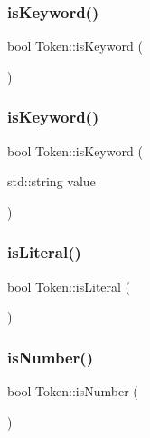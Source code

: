 \mbox{\label{classToken_a5ce5cda79ee936e3c9ff0fb3969420f8}} 
\subsubsection{\texorpdfstring{is\+Keyword()}{isKeyword()}\hspace{0.1cm}{\footnotesize\ttfamily [1/2]}}
{\footnotesize\ttfamily bool Token\+::is\+Keyword (\begin{DoxyParamCaption}{ }\end{DoxyParamCaption})}

\mbox{\label{classToken_a86d5ce12cf462b6621ccc2a8465b5bc0}} 
\subsubsection{\texorpdfstring{is\+Keyword()}{isKeyword()}\hspace{0.1cm}{\footnotesize\ttfamily [2/2]}}
{\footnotesize\ttfamily bool Token\+::is\+Keyword (\begin{DoxyParamCaption}\item[{std\+::string}]{value }\end{DoxyParamCaption})}

\mbox{\label{classToken_afd50bb7c9ca079392c1edda106bd6345}} 
\subsubsection{\texorpdfstring{is\+Literal()}{isLiteral()}}
{\footnotesize\ttfamily bool Token\+::is\+Literal (\begin{DoxyParamCaption}{ }\end{DoxyParamCaption})}

\mbox{\label{classToken_a4aabdc4152c3a1b000a83488c420a7d3}} 
\subsubsection{\texorpdfstring{is\+Number()}{isNumber()}\hspace{0.1cm}{\footnotesize\ttfamily [1/2]}}
{\footnotesize\ttfamily bool Token\+::is\+Number (\begin{DoxyParamCaption}{ }\end{DoxyParamCaption})}


